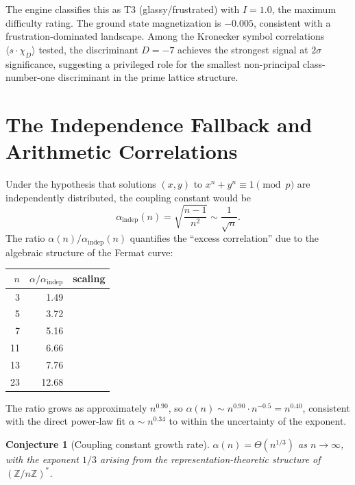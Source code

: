 \documentclass[11pt]{amsart}
\newtheorem{conjecture}[theorem]{Conjecture}
\theoremstyle{definition}
\begin{document}
The engine classifies this as T3 (glassy/frustrated) with $I = 1.0$, the maximum difficulty rating. The ground state magnetization is $-0.005$, consistent with a frustration-dominated landscape. Among the Kronecker symbol correlations $\langle s \cdot \chi_D \rangle$ tested, the discriminant $D = -7$ achieves the strongest signal at $2\sigma$ significance, suggesting a privileged role for the smallest non-principal class-number-one discriminant in the prime lattice structure.


\section{The Independence Fallback and Arithmetic Correlations}
\label{sec:independence}

Under the hypothesis that solutions $(x, y)$ to $x^n + y^n \equiv 1 \pmod{p}$ are independently distributed, the coupling constant would be
\[
\alpha_{\mathrm{indep}}(n) = \sqrt{\frac{n-1}{n^2}} \sim \frac{1}{\sqrt{n}}.
\]
The ratio $\alpha(n)/\alpha_{\mathrm{indep}}(n)$ quantifies the ``excess correlation'' due to the algebraic structure of the Fermat curve:

\begin{center}
\begin{tabular}{r r r}
\toprule
$n$ & $\alpha/\alpha_{\mathrm{indep}}$ & scaling \\
\midrule
3 & 1.49 & \\
5 & 3.72 & \\
7 & 5.16 & \\
11 & 6.66 & \\
13 & 7.76 & \\
23 & 12.68 & \\
\bottomrule
\end{tabular}
\end{center}

The ratio grows as approximately $n^{0.90}$, so $\alpha(n) \sim n^{0.90} \cdot n^{-0.5} = n^{0.40}$, consistent with the direct power-law fit $\alpha \sim n^{0.34}$ to within the uncertainty of the exponent.

\begin{conjecture}[Coupling constant growth rate]
$\alpha(n) = \Theta(n^{1/3})$ as $n \to \infty$, with the exponent $1/3$ arising from the representation-theoretic structure of $(\mathbb{Z}/n\mathbb{Z})^*$.
\end{conjecture}
\end{document}
